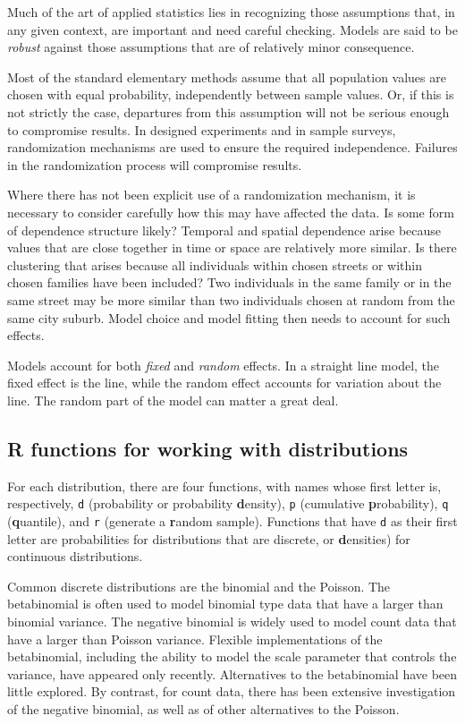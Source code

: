 Much of the art of applied statistics lies in recognizing those
assumptions that, in any given context, are important and need 
careful checking. Models are said to be \textit{robust} against 
those assumptions that are of relatively minor consequence.

Most of the standard elementary methods assume that all population 
values are chosen with equal probability, independently between 
sample values.  Or, if this is not strictly the case, departures
from this assumption will not be serious enough to compromise
results.  In designed experiments and in sample surveys, 
randomization mechanisms are used to ensure the required 
independence.  Failures in the randomization process will 
compromise results.

Where there has not been explicit use of a randomization mechanism,
it is necessary to consider carefully how this may have affected the
data. Is some form of dependence structure likely? Temporal and
spatial dependence arise because values that are close together in
time or space are relatively more similar. Is there clustering that
arises because all individuals within chosen streets or within chosen
families have been included? Two individuals in the same family or in
the same street may be more similar than two individuals chosen at
random from the same city suburb.  Model choice and model fitting
then needs to account for such effects.  

Models account for both
\textit{fixed} and \textit{random} effects.  In a straight line
model, the fixed effect is the line, while the random effect
accounts for variation about the line.  The random part of the
model can matter a great deal.

\subsection{R functions for working with distributions}

For each distribution, there are four functions, with names
whose first letter is, respectively, \texttt{d} (probability or
probability \textbf{d}ensity),
\texttt{p} (cumulative \textbf{p}robability),
\texttt{q} (\textbf{q}uantile), and \texttt{r} (generate a
\textbf{r}andom sample).  Functions that have \texttt{d} as
their first letter are probabilities for distributions that are
discrete, or \textbf{d}ensities) for continuous distributions.

Common discrete distributions are the binomial and the Poisson.
The betabinomial is often used to model binomial type data that
have a larger than binomial variance.  The negative binomial
is widely used to model count data that have a larger than
Poisson variance.  Flexible implementations of the betabinomial,
including the ability to model the scale parameter that controls
the variance, have appeared only recently.  Alternatives to the
betabinomial have been little explored.  By contrast, for count
data, there has been extensive investigation of the negative
binomial, as well as of other alternatives to the Poisson.

